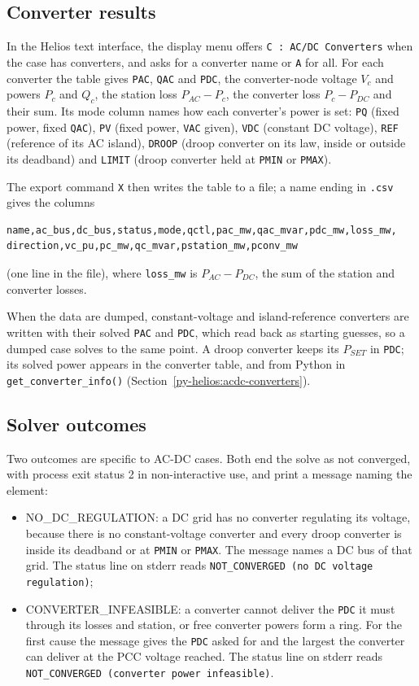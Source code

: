 \subsection{Converter results}

In the Helios text interface, the display menu offers {\tt C : AC/DC Converters} when the case has converters, and asks for a converter name or {\tt A} for all. For each converter the table gives {\tt PAC}, {\tt QAC} and {\tt PDC}, the converter-node voltage $V_c$ and powers $P_c$ and $Q_c$, the station loss $P_{AC} - P_c$, the converter loss $P_c - P_{DC}$ and their sum. Its mode column names how each converter's power is set: {\tt PQ} (fixed power, fixed {\tt QAC}), {\tt PV} (fixed power, {\tt VAC} given), {\tt VDC} (constant DC voltage), {\tt REF} (reference of its AC island), {\tt DROOP} (droop converter on its law, inside or outside its deadband) and {\tt LIMIT} (droop converter held at {\tt PMIN} or {\tt PMAX}).

The export command {\tt X} then writes the table to a file; a name ending in {\tt .csv} gives the columns

{\small
\begin{verbatim}
name,ac_bus,dc_bus,status,mode,qctl,pac_mw,qac_mvar,pdc_mw,loss_mw,
direction,vc_pu,pc_mw,qc_mvar,pstation_mw,pconv_mw
\end{verbatim}
}

(one line in the file), where {\tt loss\_mw} is $P_{AC} - P_{DC}$, the sum of the station and converter losses.

When the data are dumped, constant-voltage and island-reference converters are written with their solved {\tt PAC} and {\tt PDC}, which read back as starting guesses, so a dumped case solves to the same point. A droop converter keeps its $P_{SET}$ in {\tt PDC}; its solved power appears in the converter table, and from Python in {\tt get\_converter\_info()} (Section~\ref{py-helios:acdc-converters}).

\subsection{Solver outcomes}\label{sec-pf-acdc-status}

Two outcomes are specific to AC-DC cases. Both end the solve as not converged, with process exit status 2 in non-interactive use, and print a message naming the element:
\begin{itemize}
\item NO\_DC\_REGULATION: a DC grid has no converter regulating its voltage, because there is no constant-voltage converter and every droop converter is inside its deadband or at {\tt PMIN} or {\tt PMAX}. The message names a DC bus of that grid. The status line on stderr reads {\tt NOT\_CONVERGED (no DC voltage regulation)};
\item CONVERTER\_INFEASIBLE: a converter cannot deliver the {\tt PDC} it must through its losses and station, or free converter powers form a ring. For the first cause the message gives the {\tt PDC} asked for and the largest the converter can deliver at the PCC voltage reached. The status line on stderr reads {\tt NOT\_CONVERGED (converter power infeasible)}.
\end{itemize}

